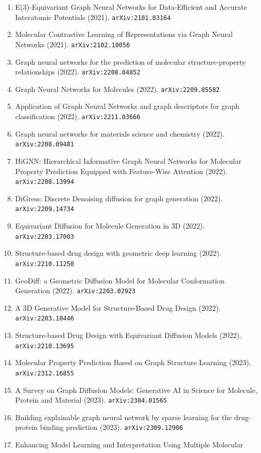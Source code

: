 \documentclass[11pt]{article}
\begin{document}
\begin{enumerate}
  \item E(3)-Equivariant Graph Neural Networks for Data-Efficient and Accurate
  Interatomic Potentials (2021). \texttt{arXiv:2101.03164}
  \item Molecular Contrastive Learning of Representations via Graph Neural
  Networks (2021). \texttt{arXiv:2102.10056}
  \item Graph neural networks for the prediction of molecular structure-property
  relationships (2022). \texttt{arXiv:2208.04852}
  \item Graph Neural Networks for Molecules (2022). \texttt{arXiv:2209.05582}
  \item Application of Graph Neural Networks and graph descriptors for graph
  classification (2022). \texttt{arXiv:2211.03666}
  \item Graph neural networks for materials science and chemistry (2022). \texttt{arXiv:2208.09481}
  \item HiGNN: Hierarchical Informative Graph Neural Networks for Molecular
  Property Prediction Equipped with Feature-Wise Attention (2022). \texttt{arXiv:2208.13994}
  \item DiGress: Discrete Denoising diffusion for graph generation (2022). \texttt{arXiv:2209.14734}
  \item Equivariant Diffusion for Molecule Generation in 3D (2022). \texttt{arXiv:2203.17003}
  \item Structure-based drug design with geometric deep learning (2022). \texttt{arXiv:2210.11250}
  \item GeoDiff: a Geometric Diffusion Model for Molecular Conformation
  Generation (2022). \texttt{arXiv:2203.02923}
  \item A 3D Generative Model for Structure-Based Drug Design (2022). \texttt{arXiv:2203.10446}
  \item Structure-based Drug Design with Equivariant Diffusion Models (2022). \texttt{arXiv:2210.13695}
  \item Molecular Property Prediction Based on Graph Structure Learning (2023). \texttt{arXiv:2312.16855}
  \item A Survey on Graph Diffusion Models: Generative AI in Science for
  Molecule, Protein and Material (2023). \texttt{arXiv:2304.01565}
  \item Building explainable graph neural network by sparse learning for the
  drug-protein binding prediction (2023). \texttt{arXiv:2309.12906}
  \item Enhancing Model Learning and Interpretation Using Multiple Molecular

\end{enumerate}
\end{document}
